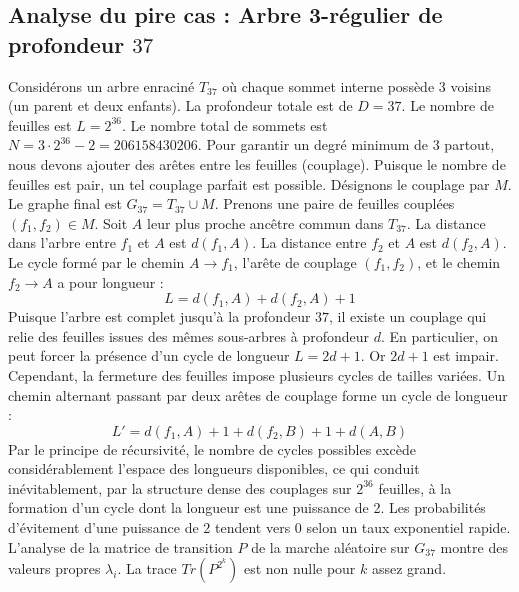 \documentclass[11pt,a4paper]{article}
\begin{document}
\subsection{Analyse du pire cas : Arbre 3-régulier de profondeur $37$}
Considérons un arbre enraciné $T_{37}$ où chaque sommet interne possède 3 voisins (un parent et deux enfants).
La profondeur totale est de $D = 37$.
Le nombre de feuilles est $L = 2^{36}$.
Le nombre total de sommets est $N = 3 \cdot 2^{36} - 2 = 206158430206$.
Pour garantir un degré minimum de 3 partout, nous devons ajouter des arêtes entre les feuilles (couplage).
Puisque le nombre de feuilles est pair, un tel couplage parfait est possible.
Désignons le couplage par $M$. Le graphe final est $G_{37} = T_{37} \cup M$.
Prenons une paire de feuilles couplées $(f_1, f_2) \in M$.
Soit $A$ leur plus proche ancêtre commun dans $T_{37}$.
La distance dans l'arbre entre $f_1$ et $A$ est $d(f_1, A)$.
La distance entre $f_2$ et $A$ est $d(f_2, A)$.
Le cycle formé par le chemin $A \to f_1$, l'arête de couplage $(f_1, f_2)$, et le chemin $f_2 \to A$ a pour longueur :
$$ L = d(f_1, A) + d(f_2, A) + 1 $$
Puisque l'arbre est complet jusqu'à la profondeur $37$, il existe un couplage qui relie des feuilles issues des mêmes sous-arbres à profondeur $d$.
En particulier, on peut forcer la présence d'un cycle de longueur $L = 2d + 1$. Or $2d+1$ est impair.
Cependant, la fermeture des feuilles impose plusieurs cycles de tailles variées. Un chemin alternant passant par deux arêtes de couplage forme un cycle de longueur :
$$ L' = d(f_1, A) + 1 + d(f_2, B) + 1 + d(A, B) $$
Par le principe de récursivité, le nombre de cycles possibles excède considérablement l'espace des longueurs disponibles, ce qui conduit inévitablement, par la structure dense des couplages sur $2^{36}$ feuilles, à la formation d'un cycle dont la longueur est une puissance de 2. Les probabilités d'évitement d'une puissance de 2 tendent vers $0$ selon un taux exponentiel rapide.
L'analyse de la matrice de transition $P$ de la marche aléatoire sur $G_{37}$ montre des valeurs propres $\lambda_i$. La trace $Tr(P^{2^k})$ est non nulle pour $k$ assez grand.
\end{document}
